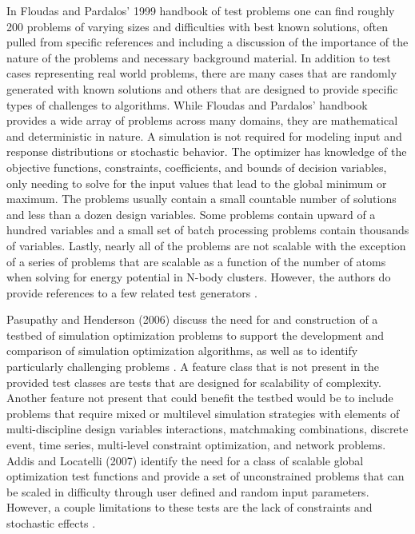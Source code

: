 \documentclass[a4paper]{article}
\begin{document}
In Floudas and Pardalos' 1999 handbook of test problems \cite{floudas_handbook_1999} one can find roughly 200 problems of varying sizes and difficulties with best known solutions, often pulled from specific references and including a discussion of the importance of the nature of the problems and necessary background material. In addition to test cases representing real world problems, there are many cases that are randomly generated with known solutions and others that are designed to provide specific types of challenges to algorithms. While Floudas and Pardalos' handbook provides a wide array of problems across many domains, they are mathematical and deterministic in nature. A simulation is not required for modeling input and response distributions or stochastic behavior. The optimizer has knowledge of the objective functions, constraints, coefficients, and bounds of decision variables, only needing to solve for the input values that lead to the global minimum or maximum. The problems usually contain a small countable number of solutions and less than a dozen design variables. Some problems contain upward of a hundred variables and a small set of batch processing problems contain thousands of variables. Lastly, nearly all of the problems are not scalable with the exception of a series of problems that are scalable as a function of the number of atoms when solving for energy potential in N-body clusters. However, the authors do provide references to a few related test generators \cite{floudas_handbook_1999}.

Pasupathy and Henderson (2006) discuss the need for and construction of a testbed of simulation optimization problems to support the development and comparison of simulation optimization algorithms, as well as to identify particularly challenging problems \cite{pasupathy_testbed_2006}. A feature class that is not present in the provided test classes are tests that are designed for scalability of complexity. Another feature not present that could benefit the testbed would be to include problems that require mixed or multilevel simulation strategies with elements of multi-discipline design variables interactions, matchmaking combinations, discrete event, time series, multi-level constraint optimization, and network problems. Addis and Locatelli (2007) identify the need for a class of scalable global optimization test functions and provide a set of unconstrained problems that can be scaled in difficulty through user defined and random input parameters. However, a couple limitations to these tests are the lack of constraints and stochastic effects \cite{addis_new_2007}.
\end{document}
